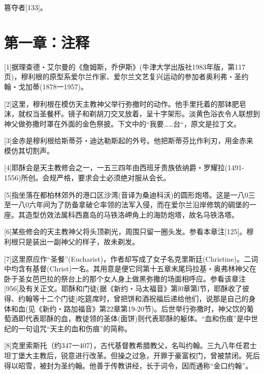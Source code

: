 \documentclass{article}
\begin{document}
篡夺者[133]。



\newpage





{\centering\section*{第一章：注释}}





[1]据理查德・艾尔曼的《詹姆斯，乔伊斯》(牛津大学出版社1983年版，第117页)，穆利根的原型系爱尔兰作家、爱尔兰文艺复兴运动的参加者奥利弗・圣约翰・戈加蒂(1878一1957)。



[2]这里，穆利根在模仿天主教神父举行弥撤时的动作。他手里托着的那钵肥皂沫，就权当圣餐杯。镜子和剃胡刀交叉放着，呈十字架形。淡黄色浴衣令人联想到神父做弥撒时罩在外面的金色祭披。下文中的“我要……台“，原文是拉丁文。



[3]金赤是穆利根给斯蒂芬・迪达勒斯起的外号。他把斯蒂芬比作利刃，用金赤来模仿其切割声。



[4]耶酥会是天主教修会之一，一五三四年由西班牙贵族依纳爵・罗耀拉(1491-1556)所创。会规严格，要求会士必须绝对服从会长。



[5]指坐落在都柏林郊外的港口区沙湾(音译为桑迪科沃)的圆形炮塔。这是一八0三至一八0六年间为了防备拿破仑率领的法军入侵，而在爱尔兰沿岸修筑的碉堡的一座。其造型仿效法属科西嘉岛的马铁洛岬角上的海防炮塔，故名马铁洛塔。



[6]某些修会的天主教神父将头顶剃光，周围只留一圈头发。参看本章注[125]。穆利根只是装出一副神父的样子，故未剃发。



[7]这里原应作“圣餐”(Eucharist)，作者却写成了女子名克里斯廷(Christine)。二词中均含有基督(Christ)一名。其用意是便它同第十五章末尾玛拉基・奥弗林神父在卧于圣女芭巴拉的祭台上的那个女人身上做黑弥撒的场面相呼应。参看该章注[956]及有关正文。耶酥和门徒(据《新约・马太福音》第l0章第l节，耶酥收了彼得、约翰等十二个门徒)吃筵席时，曾把饼和酒祝福后递给他们，说那是自己的身体和血(见《新约・路加福音》第22章第19-20节)。后世举行弥撒时，神父饮的葡萄酒即代表耶酥的血，教徒领的圣体(面饼)则代表耶酥的躯体。“血和伤痕”是中世纪的一句诅咒“天主的血和伤痕”的简称。



[8]克里索斯托（约347一407），古代基督教希腊教父，名叫约翰。三九八年任君士坦丁堡大主教后，锐意进行改革。但操之过急，开罪于豪富权门，曾被禁闭。死后得以昭雪，被封为圣约翰。他善于传教讲经，长于词令，因而通称“金口约翰”。
\end{document}
